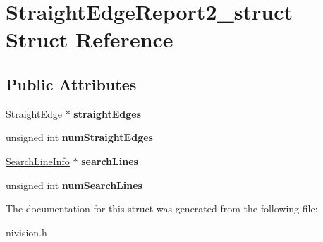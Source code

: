 \hypertarget{structStraightEdgeReport2__struct}{\section{\-Straight\-Edge\-Report2\-\_\-struct \-Struct \-Reference}
\label{structStraightEdgeReport2__struct}
}
\subsection*{\-Public \-Attributes}
\begin{DoxyCompactItemize}
\item 
\hypertarget{structStraightEdgeReport2__struct_a4d3743465784494b07d848e747596351}{\hyperlink{structStraightEdge__struct}{\-Straight\-Edge} $\ast$ {\bfseries straight\-Edges}}\label{structStraightEdgeReport2__struct_a4d3743465784494b07d848e747596351}

\item 
\hypertarget{structStraightEdgeReport2__struct_ada1e539abf1dd770903c5ea9b9f490ad}{unsigned int {\bfseries num\-Straight\-Edges}}\label{structStraightEdgeReport2__struct_ada1e539abf1dd770903c5ea9b9f490ad}

\item 
\hypertarget{structStraightEdgeReport2__struct_af949a2c45820f1a872f702ec0ec0668a}{\hyperlink{structSearchLineInfo__struct}{\-Search\-Line\-Info} $\ast$ {\bfseries search\-Lines}}\label{structStraightEdgeReport2__struct_af949a2c45820f1a872f702ec0ec0668a}

\item 
\hypertarget{structStraightEdgeReport2__struct_a1f533a825332301f5722af5cd89d2f15}{unsigned int {\bfseries num\-Search\-Lines}}\label{structStraightEdgeReport2__struct_a1f533a825332301f5722af5cd89d2f15}

\end{DoxyCompactItemize}


\-The documentation for this struct was generated from the following file\-:\begin{DoxyCompactItemize}
\item 
nivision.\-h\end{DoxyCompactItemize}
